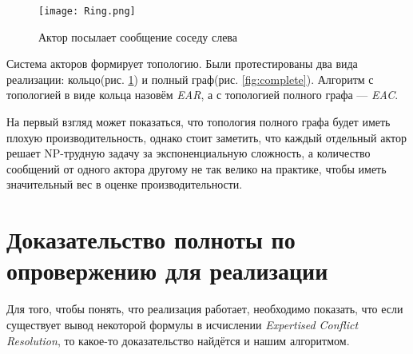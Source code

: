 \begin{figure}[!h]
\centering
\texttt{[image: Ring.png]}
\caption{Актор посылает сообщение соседу слева}\label{fig:ring}
\end{figure}

Система акторов формирует топологию. Были протестированы два вида реализации: кольцо(рис. \ref{fig:ring}) и полный граф(рис. \ref{fig:complete}). Алгоритм с топологией в виде кольца назовём \emph{EAR}, а с топологией полного графа --- \emph{EAC}. 

На первый взгляд может показаться, что топология полного графа будет иметь плохую производительность, однако стоит заметить, что каждый отдельный актор решает NP-трудную задачу за экспоненциальную сложность, а количество сообщений от одного актора другому не так велико на практике, чтобы иметь значительный вес в оценке производительности.

\section{Доказательство полноты по опровержению для реализации}
Для того, чтобы понять, что реализация работает, необходимо показать, что если существует вывод некоторой формулы в исчислении \emph{Expertised Conflict Resolution}, то какое-то доказательство найдётся и нашим алгоритмом. 


